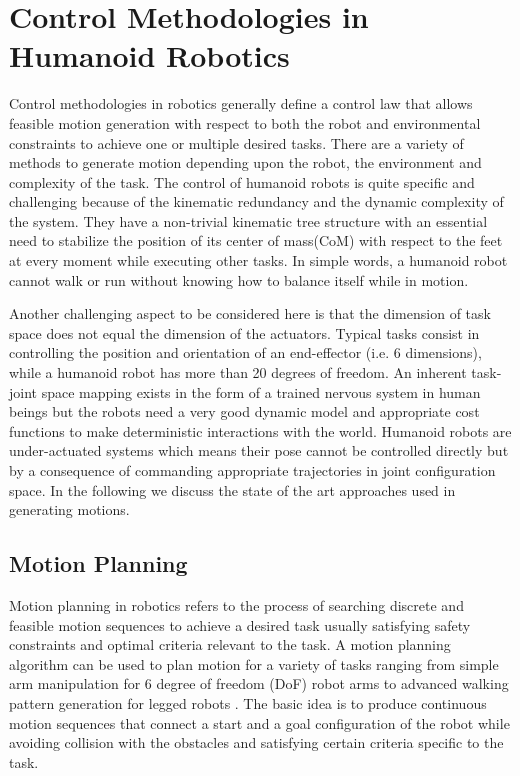 \section{Control Methodologies in Humanoid Robotics}
\label{sec:control_methods}
Control methodologies in robotics generally define a control law that allows feasible motion generation with respect to both the robot and environmental constraints to achieve one or multiple desired tasks. There are a variety of methods to generate motion depending upon the robot, the environment and complexity of the task. The control of humanoid robots is quite specific and challenging because of the kinematic redundancy and the dynamic complexity of the system. They have a non-trivial kinematic tree structure with an essential need to stabilize the position of its center of mass(CoM) with respect to the feet at every moment while executing other tasks. In simple words, a humanoid robot cannot walk or run without knowing how to balance itself while in motion. 

Another challenging aspect to be considered here is that the dimension of task space does not equal the dimension of the actuators. Typical tasks consist in controlling the position and orientation of an end-effector (i.e. 6 dimensions), while a humanoid robot has more than 20 degrees of freedom. An inherent task-joint space mapping exists in the form of a trained nervous system in human beings but the robots need a very good dynamic model and appropriate cost functions to make deterministic interactions with the world. Humanoid robots are under-actuated systems which means their pose cannot be controlled directly but by a consequence of commanding appropriate trajectories in joint configuration space. In the following we discuss the state of the art 
approaches used in generating motions.

\subsection{Motion Planning}
Motion planning in robotics refers to the process of searching discrete and feasible motion sequences to achieve a desired task usually satisfying safety constraints and optimal criteria relevant to the task. A motion planning algorithm can be used to plan motion for a variety of tasks ranging from simple arm manipulation for 6 degree of freedom (DoF) robot arms \cite{donald1987search,lozano1987simple} to advanced walking pattern generation for legged robots \cite{kajita2003biped,huang2001planning,harada2006analytical}. The basic idea is to produce continuous motion sequences that connect a start and a goal configuration of the robot while avoiding collision with the obstacles and satisfying certain criteria specific to the task. 
